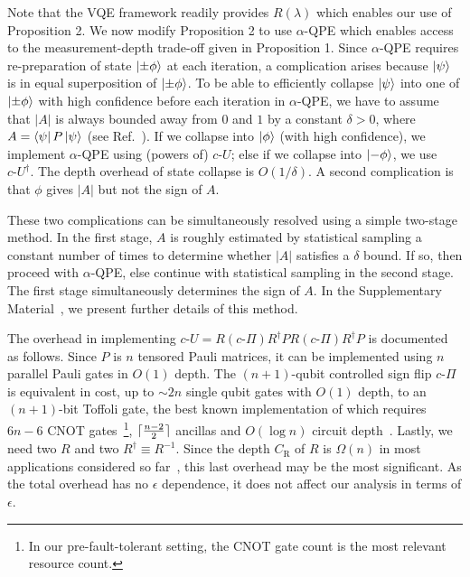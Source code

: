 \documentclass[twocolumn,
 reprint,
 amsmath,amssymb,
 aps,
 floatfix,
superscriptaddress
]{revtex4-1}
\DeclarePairedDelimiter{\ceil}{\lceil}{\rceil}
\begin{document}
Note that the VQE framework readily provides $R(\lambda)$ which enables our use of Proposition 2. We now modify Proposition 2 to use $\alpha$-QPE which enables access to the measurement-depth trade-off given in Proposition 1. Since $\alpha$-QPE requires re-preparation of state $\Ket{\pm\phi}$ at each iteration, a complication arises because $\Ket{\psi}$ is in equal superposition of $\Ket{\pm\phi}$. To be able to efficiently collapse $\Ket{\psi}$ into one of $\Ket{\pm\phi}$ with high confidence before each iteration in $\alpha$-QPE, we have to assume that $|A|$ is always bounded away from $0$ and $1$ by a constant $\delta>0$, where $A=\Bra{\psi}P\Ket{\psi}$ (see Ref.~\cite[Parallelizability]{Knill2007}). If we collapse into $\Ket{\phi}$ (with high confidence), we implement $\alpha$-QPE using (powers of) $c\text{-}U$; else if we collapse into $\Ket{-\phi}$, we use $c\text{-}U^{\dagger}$. The depth overhead of state collapse is $O(1/\delta)$. A second complication is that $\phi$ gives $|A|$ but not the sign of $A$. 

These two complications can be simultaneously resolved using a simple two-stage method. In the first stage,  $A$ is roughly estimated by statistical sampling a constant number of times to determine whether $|A|$ satisfies a $\delta$ bound. If so, then proceed with $\alpha$-QPE, else continue with statistical sampling in the second stage. The first stage simultaneously determines the sign of $A$. In the Supplementary Material~\cite{SuppMat}, we present further details of this method.

The overhead in implementing $c\text{-}U=  R (c\text{-} \Pi) R^{\dagger} P R (c\text{-} \Pi) R^{\dagger} P$ is documented as follows. Since $P$ is $n$ tensored Pauli matrices, it can be implemented using $n$ parallel Pauli gates in $O(1)$ depth. The $(n+1)$-qubit controlled sign flip $c\text{-}\Pi$
is equivalent in cost, up to $\sim2n$
single qubit gates with $O(1)$ depth, to an $(n+1)$-bit Toffoli gate, the best known implementation of which requires $6n-6$ CNOT gates~\footnote{In our pre-fault-tolerant setting, the CNOT gate count is the most relevant resource count.}, $\ceil{\frac{n-2}{2}}$ ancillas and $O(\log{n})$ circuit depth~\cite{Maslov2016}. Lastly, we need two $R$ and two $R^{\dagger}\equiv R^{-1}$. Since the depth $C_\text{R}$ of $R$ is $\Omega(n)$ in most applications considered so far~\cite{Babbush2018}, this last overhead may be the most significant. As the total overhead has no $\epsilon$ dependence, it does not affect our analysis in terms of $\epsilon$.
\vspace{-0.2cm}
\end{document}
